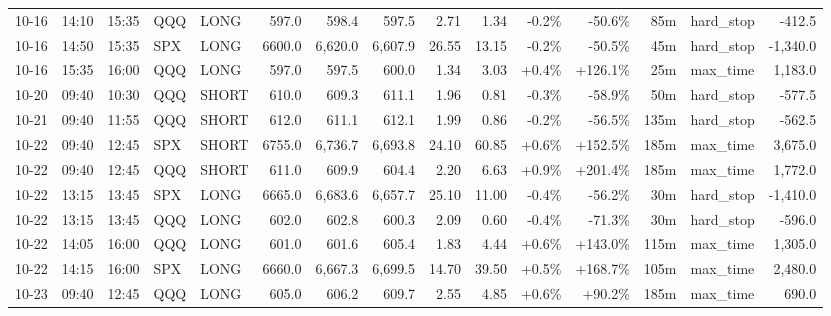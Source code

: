 \documentclass[11pt,a4paper,twoside]{article}
\begin{document}
\begin{landscape}
\begin{center}
\begin{longtable}{>{\color{txtmain}}l l l l l r r r r r r r r >{\color{txtmain}}l r}
10-16 & 14:10 & 15:35 & QQQ & LONG & 597.0 & 598.4 & 597.5 & 2.71 & 1.34 & \textcolor{lossred}{-0.2\%} & \textcolor{lossred}{-50.6\%} & 85m & hard\_stop & \textcolor{lossred}{-412.5} \\
10-16 & 14:50 & 15:35 & SPX & LONG & 6600.0 & 6,620.0 & 6,607.9 & 26.55 & 13.15 & \textcolor{lossred}{-0.2\%} & \textcolor{lossred}{-50.5\%} & 45m & hard\_stop & \textcolor{lossred}{-1,340.0} \\
10-16 & 15:35 & 16:00 & QQQ & LONG & 597.0 & 597.5 & 600.0 & 1.34 & 3.03 & \textcolor{wingreen}{+0.4\%} & \textcolor{wingreen}{+126.1\%} & 25m & max\_time & \textcolor{wingreen}{1,183.0} \\
10-20 & 09:40 & 10:30 & QQQ & SHORT & 610.0 & 609.3 & 611.1 & 1.96 & 0.81 & \textcolor{lossred}{-0.3\%} & \textcolor{lossred}{-58.9\%} & 50m & hard\_stop & \textcolor{lossred}{-577.5} \\
10-21 & 09:40 & 11:55 & QQQ & SHORT & 612.0 & 611.1 & 612.1 & 1.99 & 0.86 & \textcolor{lossred}{-0.2\%} & \textcolor{lossred}{-56.5\%} & 135m & hard\_stop & \textcolor{lossred}{-562.5} \\
10-22 & 09:40 & 12:45 & SPX & SHORT & 6755.0 & 6,736.7 & 6,693.8 & 24.10 & 60.85 & \textcolor{wingreen}{+0.6\%} & \textcolor{wingreen}{+152.5\%} & 185m & max\_time & \textcolor{wingreen}{3,675.0} \\
10-22 & 09:40 & 12:45 & QQQ & SHORT & 611.0 & 609.9 & 604.4 & 2.20 & 6.63 & \textcolor{wingreen}{+0.9\%} & \textcolor{wingreen}{+201.4\%} & 185m & max\_time & \textcolor{wingreen}{1,772.0} \\
10-22 & 13:15 & 13:45 & SPX & LONG & 6665.0 & 6,683.6 & 6,657.7 & 25.10 & 11.00 & \textcolor{lossred}{-0.4\%} & \textcolor{lossred}{-56.2\%} & 30m & hard\_stop & \textcolor{lossred}{-1,410.0} \\
10-22 & 13:15 & 13:45 & QQQ & LONG & 602.0 & 602.8 & 600.3 & 2.09 & 0.60 & \textcolor{lossred}{-0.4\%} & \textcolor{lossred}{-71.3\%} & 30m & hard\_stop & \textcolor{lossred}{-596.0} \\
10-22 & 14:05 & 16:00 & QQQ & LONG & 601.0 & 601.6 & 605.4 & 1.83 & 4.44 & \textcolor{wingreen}{+0.6\%} & \textcolor{wingreen}{+143.0\%} & 115m & max\_time & \textcolor{wingreen}{1,305.0} \\
10-22 & 14:15 & 16:00 & SPX & LONG & 6660.0 & 6,667.3 & 6,699.5 & 14.70 & 39.50 & \textcolor{wingreen}{+0.5\%} & \textcolor{wingreen}{+168.7\%} & 105m & max\_time & \textcolor{wingreen}{2,480.0} \\
10-23 & 09:40 & 12:45 & QQQ & LONG & 605.0 & 606.2 & 609.7 & 2.55 & 4.85 & \textcolor{wingreen}{+0.6\%} & \textcolor{wingreen}{+90.2\%} & 185m & max\_time & \textcolor{wingreen}{690.0} \\

\end{longtable}
\end{center}
\end{landscape}
\end{document}
